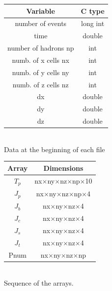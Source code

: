 \documentclass[12pt, a4paper]{article}
\begin{document}
\begin{minipage}{0.6\textwidth}
	\centering
	\begin{tabular}{|c | c |} 
		\hline
		\cellcolor{Yellow}Variable & \cellcolor{Yellow} C type \\
		\hline
		\cellcolor{SpringGreen}number of events&\cellcolor{SpringGreen}long int\\
		\hline
		\cellcolor{LimeGreen}time&\cellcolor{LimeGreen}double\\
		\hline
		\cellcolor{YellowGreen}number of hadrons np&\cellcolor{YellowGreen}int\\
		\hline
		\cellcolor{SeaGreen}numb. of x cells nx&\cellcolor{SeaGreen}int\\
		\hline
		\cellcolor{SeaGreen}numb. of y cells ny&\cellcolor{SeaGreen}int\\
		\hline
		\cellcolor{SeaGreen}numb. of z cells nz&\cellcolor{SeaGreen}int\\
		\hline
		\cellcolor{BlueGreen}dx&\cellcolor{BlueGreen}double\\
		\hline
		\cellcolor{BlueGreen}dy&\cellcolor{BlueGreen}double\\
		\hline
		\cellcolor{BlueGreen}dz&\cellcolor{BlueGreen}double\\
		\hline
	\end{tabular}\\
	\vspace{1mm}
	\footnotesize{Data at the beginning of each file}
	\vspace{5mm}	
\end{minipage}
\begin{minipage}{0.4\textwidth}
	\centering
	\begin{tabular}{| c | c |} 
		\hline
		\cellcolor{Yellow}Array & \cellcolor{Yellow} Dimensions \\
		\hline
		\cellcolor{SpringGreen}$T_p$&\cellcolor{SpringGreen}nx$\times$ny$\times$nz$\times$np$\times$10\\
		\hline
		\cellcolor{LimeGreen}$J_p$&\cellcolor{LimeGreen}nx$\times$ny$\times$nz$\times$np$\times$4\\
		\hline
		\cellcolor{ForestGreen}$J_b$&\cellcolor{ForestGreen}nx$\times$ny$\times$nz$\times$4\\
		\hline
		\cellcolor{SkyBlue}$J_c$&\cellcolor{SkyBlue}nx$\times$ny$\times$nz$\times$4\\
		\hline
		\cellcolor{Turquoise}$J_s$&\cellcolor{Turquoise}nx$\times$ny$\times$nz$\times$4\\
		\hline
		\cellcolor{Cerulean}$J_t$&\cellcolor{Cerulean}nx$\times$ny$\times$nz$\times$4\\
		\hline
		\cellcolor{RoyalBlue}Pnum&\cellcolor{RoyalBlue}nx$\times$ny$\times$nz$\times$np\\
		\hline
	\end{tabular}\\
	\vspace{1mm}
	\footnotesize{Sequence of the arrays.}
\end{minipage}
\end{document}
